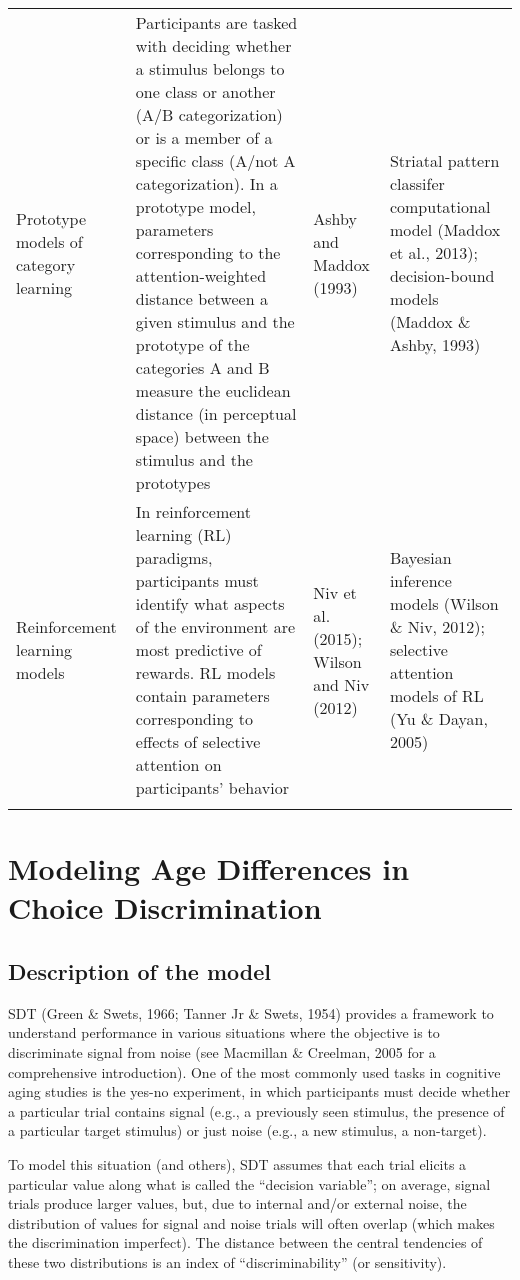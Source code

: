 \documentclass[
  english,
  ,man,floatsintext]{apa6}
\begin{document}
\begin{table}[t]
{\begin{tabular}{p{}p{}p{}p{}}
  Prototype models of category learning & Participants are tasked with deciding whether a stimulus belongs to one class or another (A/B categorization) or is a member of a specific class (A/not A categorization). In a prototype model, parameters corresponding to the attention-weighted distance between a given stimulus and the prototype of the categories A and B measure the euclidean distance (in perceptual space) between the stimulus and the prototypes & Ashby and Maddox (1993) & Striatal pattern classifer computational model (Maddox et al., 2013); decision-bound models (Maddox \& Ashby, 1993) \\ 
  Reinforcement learning models & In reinforcement learning (RL) paradigms, participants must identify what aspects of the environment are most predictive of rewards. RL models contain parameters corresponding to effects of selective attention on participants' behavior & Niv et al. (2015); Wilson and Niv (2012) & Bayesian inference models (Wilson \& Niv, 2012); selective attention models of RL (Yu \& Dayan, 2005) \\ 
   \bottomrule \\ \end{tabular}
}
\end{table}

\hypertarget{modeling-age-differences-in-choice-discrimination}{%
\section{Modeling Age Differences in Choice Discrimination}\label{modeling-age-differences-in-choice-discrimination}}

\hypertarget{description-of-the-model}{%
\subsection{Description of the model}\label{description-of-the-model}}

SDT (Green \& Swets, 1966; Tanner Jr \& Swets, 1954) provides a framework to understand performance in various situations where the objective is to discriminate signal from noise (see Macmillan \& Creelman, 2005 for a comprehensive introduction). One of the most commonly used tasks in cognitive aging studies is the yes-no experiment, in which participants must decide whether a particular trial contains signal (e.g., a previously seen stimulus, the presence of a particular target stimulus) or just noise (e.g., a new stimulus, a non-target).

To model this situation (and others), SDT assumes that each trial elicits a particular value along what is called the \enquote{decision variable}; on average, signal trials produce larger values, but, due to internal and/or external noise, the distribution of values for signal and noise trials will often overlap (which makes the discrimination imperfect). The distance between the central tendencies of these two distributions is an index of \enquote{discriminability} (or sensitivity).
\end{document}
